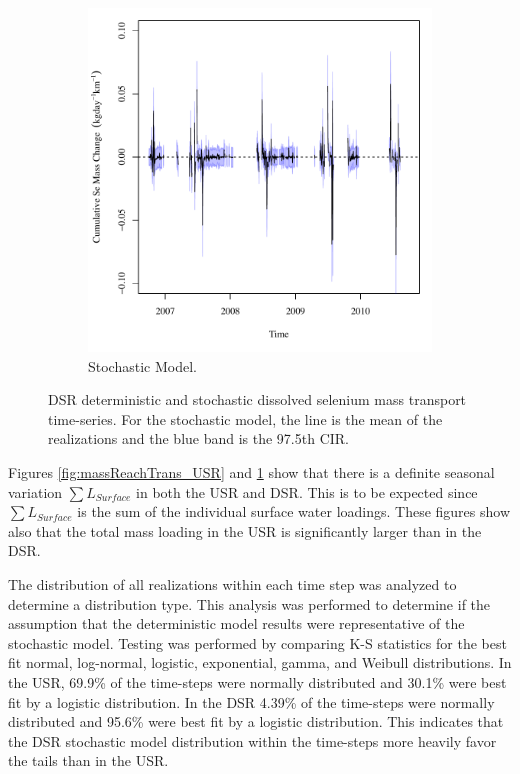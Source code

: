 \begin{linenumbers}
\begin{landscape}
\begin{figure}
\begin{subfigure}{0.7\textwidth}
			\includegraphics[width=\tableCustomSize]{"Figures/Results_DSR/Stochastic/Balance Mass - Storage"}
			\caption{Stochastic Model.}
		\end{subfigure}
		\caption[DSR deterministic and stochastic dissolved selenium mass transport time-series.]{DSR deterministic and stochastic dissolved selenium mass transport time-series.  For the stochastic model, the line is the mean of the realizations and the blue band is the 97.5th CIR.}
		\label{fig:massReachTrans_DSR}
	\end{figure}
\end{landscape}

Figures \ref{fig:massReachTrans_USR} and \ref{fig:massReachTrans_DSR} show that there is a definite seasonal variation $ \sum L_{Surface} $ in both the USR and DSR.  This is to be expected since $ \sum L_{Surface} $ is the sum of the individual surface water loadings.  These figures show also that the total mass loading in the USR is significantly larger than in the DSR.

The distribution of all realizations within each time step was analyzed to determine a distribution type.  This analysis was performed to determine if the assumption that the deterministic model results were representative of the stochastic model.  Testing was performed by comparing K-S statistics for the best fit normal, log-normal, logistic, exponential, gamma, and Weibull distributions.  In the USR, 69.9\% of the time-steps were normally distributed and 30.1\% were best fit by a logistic distribution.  In the DSR 4.39\% of the time-steps were normally distributed and 95.6\% were best fit by a logistic distribution.  This indicates that the DSR stochastic model distribution within the time-steps more heavily favor the tails than in the USR. 


\end{linenumbers}
